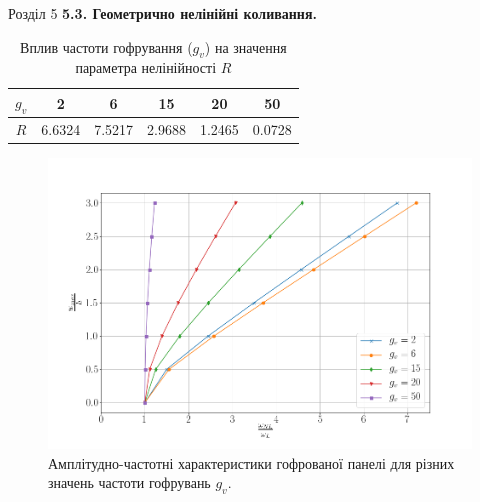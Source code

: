\documentclass[8pt]{beamer}
\numberwithin{figure}{section}
\numberwithin{equation}{section}
\numberwithin{table}{section}
\begin{document}
\begin{frame}{Розділ 5}
\textbf{5.3. Геометрично нелінійні коливання.}

\begin{table}[h!]
\centering
 \begin{tabular}{| c | c | c | c | c | c |} 
 \hline
 $g_v$ & 2 & 6 & 15 & 20 & 50 \\ 
  \hline
 $R$ & 6.6324 & 7.5217 & 2.9688 & 1.2465 & 0.0728 \\
   \hline
\end{tabular}
\caption{Вплив частоти гофрування ($g_v$) на значення параметра нелінійності $R$}
\label{table:4}
\end{table}
\begin{figure}
	\includegraphics[scale=0.23]{pic/corrugated_nonlinear.png}
		\caption{Амплітудно-частотні характеристики гофрованої панелі для різних значень частоти гофрувань $g_v$.}
\end{figure}

\end{frame}
\end{document}
